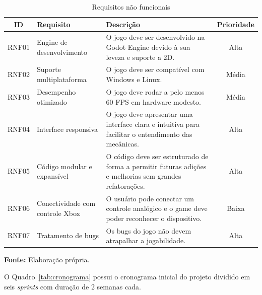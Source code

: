 \begin{table}[H]
\centering
\caption{Requisitos não funcionais}
\label{tab:requisitos-nao-funcionais}
\begin{tabular}{|c|p{4cm}|p{6cm}|c|}
\hline
\textbf{ID} & \textbf{Requisito} & \textbf{Descrição} & \textbf{Prioridade} \\
\hline
RNF01 & Engine de desenvolvimento & O jogo deve ser desenvolvido na Godot Engine devido à sua leveza e suporte a 2D. & Alta \\
\hline
RNF02 & Suporte multiplataforma & O jogo deve ser compatível com Windows e Linux. & Média \\
\hline
RNF03 & Desempenho otimizado & O jogo deve rodar a pelo menos 60 FPS em hardware modesto. & Média \\
\hline
RNF04 & Interface responsiva & O jogo deve apresentar uma interface clara e intuitiva para facilitar o entendimento das mecânicas. & Alta \\
\hline
RNF05 & Código modular e expansível & O código deve ser estruturado de forma a permitir futuras adições e melhorias sem grandes refatorações. & Alta \\
\hline
RNF06 & Conectividade com controle Xbox & O usuário pode conectar um controle analógico e o game deve poder reconhecer o dispositivo. & Baixa \\
\hline
RNF07 & Tratamento de bugs & Os bugs do jogo não devem atrapalhar a jogabilidade. & Alta \\
\hline
\end{tabular}

\vspace{0.3em}
\small \textbf{Fonte:} Elaboração própria.
\end{table}

O Quadro~\ref{tab:cronograma} possui o cronograma inicial do projeto dividido em seis \textit{sprints} com duração de 2 semanas cada.

